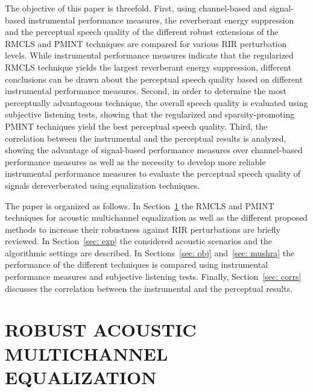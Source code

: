 \documentclass[fleqn]{aes2e}
\begin{document}
The objective of this paper is threefold. 
First, using channel-based and signal-based instrumental performance measures, the reverberant energy suppression and the perceptual speech quality of the different robust extensions of the RMCLS and PMINT techniques are compared for various RIR perturbation levels.
While instrumental  performance measures indicate that the regularized RMCLS technique yields the largest reverberant energy suppression, different conclusions can be drawn about the perceptual speech quality based on different instrumental performance  measures. 
Second, in order to determine the most perceptually advantageous technique, the overall speech quality is evaluated using subjective listening tests, showing that the regularized and sparsity-promoting PMINT techniques yield the best perceptual speech quality.
Third, the correlation between the instrumental and the perceptual results is analyzed, showing the advantage of signal-based performance measures over channel-based performance measures as well as the necessity to develop more reliable instrumental performance measures to evaluate the perceptual speech quality of signals dereverberated using equalization techniques.

The paper is organized as follows. 
In Section~\ref{sec: equalization} the RMCLS and PMINT techniques for acoustic multichannel equalization as well as the different proposed methods to increase their robustness against RIR perturbations are briefly reviewed. 
In Section~\ref{sec: exp} the considered acoustic scenarios and the algorithmic settings are described.
In Sections~\ref{sec: obj} and~\ref{sec: mushra} the performance of the different techniques is compared using instrumental performance measures and subjective listening tests.
Finally, Section~\ref{sec: corrs} discusses the correlation between the instrumental and the perceptual results.
\section{ROBUST ACOUSTIC MULTICHANNEL EQUALIZATION}
\label{sec: equalization}
\end{document}
